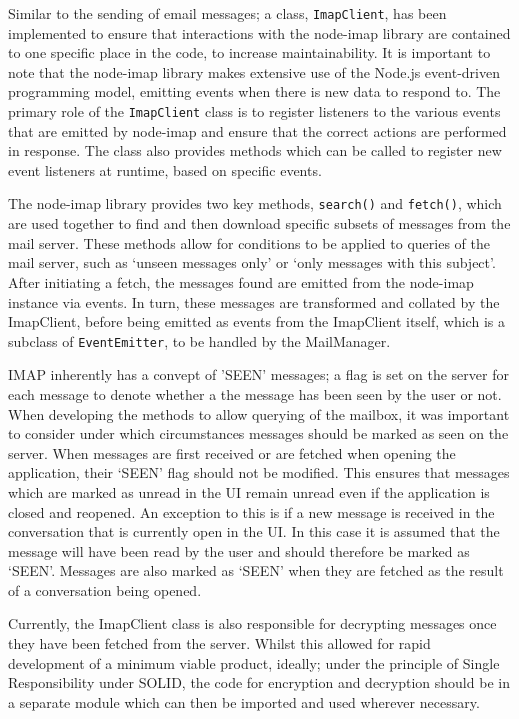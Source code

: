 Similar to the sending of email messages; a class, \verb|ImapClient|, has been implemented to ensure that interactions with the node-imap library are contained to one specific place in the code, to increase maintainability. It is important to note that the node-imap library makes extensive use of the Node.js event-driven programming model, emitting events when there is new data to respond to. The primary role of the \verb|ImapClient| class is to register listeners to the various events that are emitted by node-imap and ensure that the correct actions are performed in response. The class also provides methods which can be called to register new event listeners at runtime, based on specific events.

The node-imap library provides two key methods, \verb|search()| and \verb|fetch()|, which are used together to find and then download specific subsets of messages from the mail server. These methods allow for conditions to be applied to queries of the mail server, such as `unseen messages only' or `only messages with this subject'. After initiating a fetch, the messages found are emitted from the node-imap instance via events. In turn, these messages are transformed and collated by the ImapClient, before being emitted as events from the ImapClient itself, which is a subclass of \verb|EventEmitter|, to be handled by the MailManager.

IMAP inherently has a convept of 'SEEN' messages; a flag is set on the server for each message to denote whether a the message has been seen by the user or not. When developing the methods to allow querying of the mailbox, it was important to consider under which circumstances messages should be marked as seen on the server. When messages are first received or are fetched when opening the application, their `SEEN' flag should not be modified. This ensures that messages which are marked as unread in the UI remain unread even if the application is closed and reopened. An exception to this is if a new message is received in the conversation that is currently open in the UI. In this case it is assumed that the message will have been read by the user and should therefore be marked as `SEEN'. Messages are also marked as `SEEN' when they are fetched as the result of a conversation being opened. 

Currently, the ImapClient class is also responsible for decrypting messages once they have been fetched from the server. Whilst this allowed for rapid development of a minimum viable product, ideally; under the principle of Single Responsibility under SOLID, the code for encryption and decryption should be in a separate module which can then be imported and used wherever necessary.

